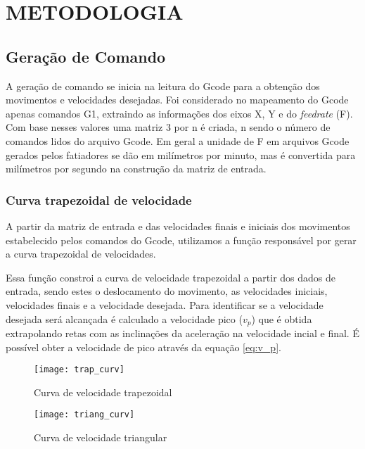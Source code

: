 \chapter{METODOLOGIA}

\section{Geração de Comando}

A geração de comando se inicia na leitura do Gcode para a obtenção dos movimentos e velocidades desejadas.
Foi considerado no mapeamento do Gcode apenas comandos G1, extraindo
as informações dos eixos X, Y e do \textit{feedrate} (F). Com base nesses valores
uma matriz 3 por n é criada, n sendo o número de comandos lidos do arquivo Gcode.
Em geral a unidade de F em arquivos Gcode gerados pelos fatiadores se dão em milímetros por minuto,
mas é convertida para milímetros por segundo na construção da matriz de entrada.

\subsection{Curva trapezoidal de velocidade}

A partir da matriz de entrada e das velocidades finais e iniciais dos movimentos estabelecido pelos comandos do Gcode,
utilizamos a função responsável por gerar a curva trapezoidal de velocidades.

Essa função constroi a curva de velocidade trapezoidal a partir dos dados
de entrada, sendo estes o deslocamento do movimento, as velocidades iniciais, velocidades finais e a velocidade desejada.
Para identificar se a velocidade desejada será alcançada é calculado a velocidade pico ($v_p$)
que é obtida extrapolando retas com as inclinações da aceleração na velocidade incial e final.
É possível obter a velocidade de pico através da equação \ref{eq:v_p}.

\begin{figure}[!htb]
    \centering
    \caption{Curva de velocidade trapezoidal}
    \texttt{[image: trap\_curv]}

    \label{fig:trap_curv}
\end{figure}

\begin{figure}[!htb]
    \centering
    \caption{Curva de velocidade triangular}
    \texttt{[image: triang\_curv]}

    \label{fig:triang_curv}
\end{figure}

